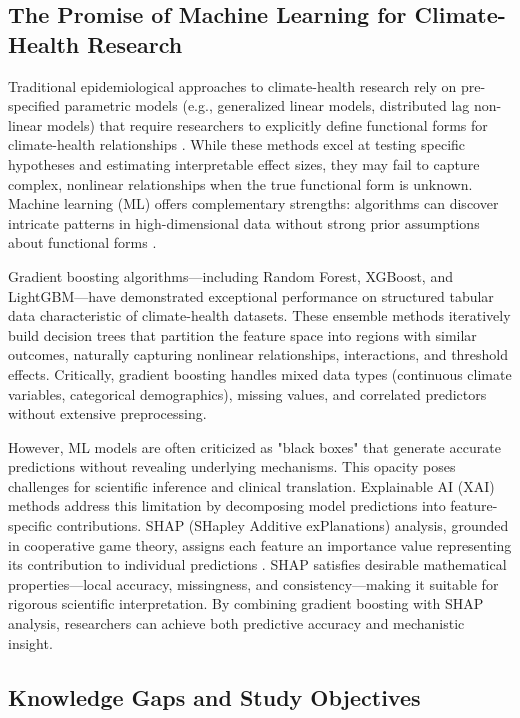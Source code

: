 \subsection{The Promise of Machine Learning for Climate-Health Research}

Traditional epidemiological approaches to climate-health research rely on pre-specified parametric models (e.g., generalized linear models, distributed lag non-linear models) that require researchers to explicitly define functional forms for climate-health relationships \citep{gasparrini2010distributed}. While these methods excel at testing specific hypotheses and estimating interpretable effect sizes, they may fail to capture complex, nonlinear relationships when the true functional form is unknown. Machine learning (ML) offers complementary strengths: algorithms can discover intricate patterns in high-dimensional data without strong prior assumptions about functional forms \citep{lundberg2017unified}.

Gradient boosting algorithms---including Random Forest, XGBoost, and LightGBM---have demonstrated exceptional performance on structured tabular data characteristic of climate-health datasets. These ensemble methods iteratively build decision trees that partition the feature space into regions with similar outcomes, naturally capturing nonlinear relationships, interactions, and threshold effects. Critically, gradient boosting handles mixed data types (continuous climate variables, categorical demographics), missing values, and correlated predictors without extensive preprocessing.

However, ML models are often criticized as "black boxes" that generate accurate predictions without revealing underlying mechanisms. This opacity poses challenges for scientific inference and clinical translation. Explainable AI (XAI) methods address this limitation by decomposing model predictions into feature-specific contributions. SHAP (SHapley Additive exPlanations) analysis, grounded in cooperative game theory, assigns each feature an importance value representing its contribution to individual predictions \citep{lundberg2017unified}. SHAP satisfies desirable mathematical properties---local accuracy, missingness, and consistency---making it suitable for rigorous scientific interpretation. By combining gradient boosting with SHAP analysis, researchers can achieve both predictive accuracy and mechanistic insight.

\subsection{Knowledge Gaps and Study Objectives}

